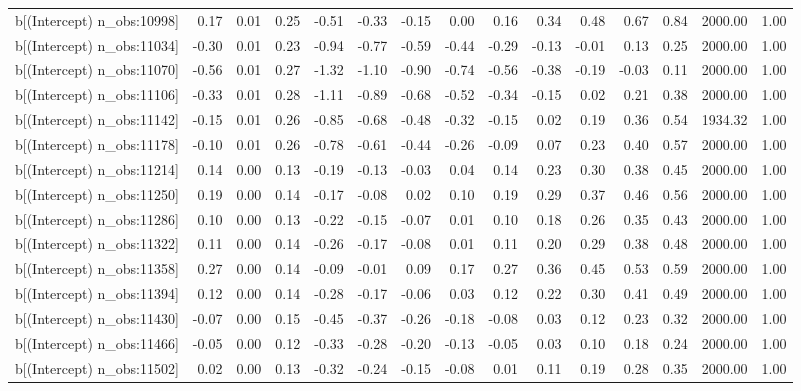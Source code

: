 \begin{table}[ht]
\begin{tabular}{rrrrrrrrrrrrrrr}
  b[(Intercept) n\_obs:10998] & 0.17 & 0.01 & 0.25 & -0.51 & -0.33 & -0.15 & 0.00 & 0.16 & 0.34 & 0.48 & 0.67 & 0.84 & 2000.00 & 1.00 \\ 
  b[(Intercept) n\_obs:11034] & -0.30 & 0.01 & 0.23 & -0.94 & -0.77 & -0.59 & -0.44 & -0.29 & -0.13 & -0.01 & 0.13 & 0.25 & 2000.00 & 1.00 \\ 
  b[(Intercept) n\_obs:11070] & -0.56 & 0.01 & 0.27 & -1.32 & -1.10 & -0.90 & -0.74 & -0.56 & -0.38 & -0.19 & -0.03 & 0.11 & 2000.00 & 1.00 \\ 
  b[(Intercept) n\_obs:11106] & -0.33 & 0.01 & 0.28 & -1.11 & -0.89 & -0.68 & -0.52 & -0.34 & -0.15 & 0.02 & 0.21 & 0.38 & 2000.00 & 1.00 \\ 
  b[(Intercept) n\_obs:11142] & -0.15 & 0.01 & 0.26 & -0.85 & -0.68 & -0.48 & -0.32 & -0.15 & 0.02 & 0.19 & 0.36 & 0.54 & 1934.32 & 1.00 \\ 
  b[(Intercept) n\_obs:11178] & -0.10 & 0.01 & 0.26 & -0.78 & -0.61 & -0.44 & -0.26 & -0.09 & 0.07 & 0.23 & 0.40 & 0.57 & 2000.00 & 1.00 \\ 
  b[(Intercept) n\_obs:11214] & 0.14 & 0.00 & 0.13 & -0.19 & -0.13 & -0.03 & 0.04 & 0.14 & 0.23 & 0.30 & 0.38 & 0.45 & 2000.00 & 1.00 \\ 
  b[(Intercept) n\_obs:11250] & 0.19 & 0.00 & 0.14 & -0.17 & -0.08 & 0.02 & 0.10 & 0.19 & 0.29 & 0.37 & 0.46 & 0.56 & 2000.00 & 1.00 \\ 
  b[(Intercept) n\_obs:11286] & 0.10 & 0.00 & 0.13 & -0.22 & -0.15 & -0.07 & 0.01 & 0.10 & 0.18 & 0.26 & 0.35 & 0.43 & 2000.00 & 1.00 \\ 
  b[(Intercept) n\_obs:11322] & 0.11 & 0.00 & 0.14 & -0.26 & -0.17 & -0.08 & 0.01 & 0.11 & 0.20 & 0.29 & 0.38 & 0.48 & 2000.00 & 1.00 \\ 
  b[(Intercept) n\_obs:11358] & 0.27 & 0.00 & 0.14 & -0.09 & -0.01 & 0.09 & 0.17 & 0.27 & 0.36 & 0.45 & 0.53 & 0.59 & 2000.00 & 1.00 \\ 
  b[(Intercept) n\_obs:11394] & 0.12 & 0.00 & 0.14 & -0.28 & -0.17 & -0.06 & 0.03 & 0.12 & 0.22 & 0.30 & 0.41 & 0.49 & 2000.00 & 1.00 \\ 
  b[(Intercept) n\_obs:11430] & -0.07 & 0.00 & 0.15 & -0.45 & -0.37 & -0.26 & -0.18 & -0.08 & 0.03 & 0.12 & 0.23 & 0.32 & 2000.00 & 1.00 \\ 
  b[(Intercept) n\_obs:11466] & -0.05 & 0.00 & 0.12 & -0.33 & -0.28 & -0.20 & -0.13 & -0.05 & 0.03 & 0.10 & 0.18 & 0.24 & 2000.00 & 1.00 \\ 
  b[(Intercept) n\_obs:11502] & 0.02 & 0.00 & 0.13 & -0.32 & -0.24 & -0.15 & -0.08 & 0.01 & 0.11 & 0.19 & 0.28 & 0.35 & 2000.00 & 1.00 \\ 

\end{tabular}
\end{table}

